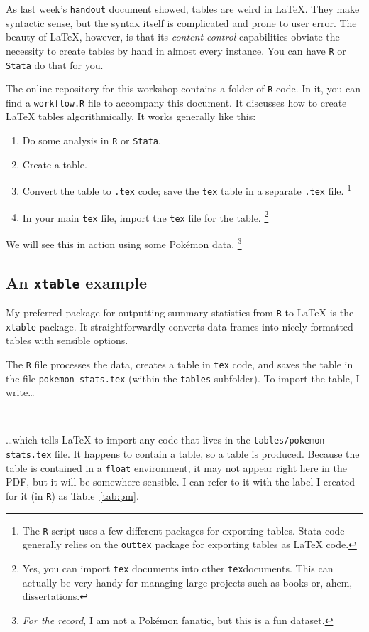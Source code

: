 \documentclass[12pt
              ]{article}
\begin{document}
As last week's \texttt{handout} document showed, tables are weird in {\LaTeX}. They make syntactic sense, but the syntax itself is complicated and prone to user error. The beauty of {\LaTeX}, however, is that its \emph{content control} capabilities obviate the necessity to create tables by hand in almost every instance. You can have \texttt{R} or \texttt{Stata} do that for you.

The online repository for this workshop contains a folder of \texttt{R} code. In it, you can find a \texttt{workflow.R} file to accompany this document. It discusses how to create {\LaTeX} tables algorithmically. It works generally like this:
\begin{enumerate}
 \item Do some analysis in \texttt{R} or \texttt{Stata}.
 \item Create a table. 
 \item Convert the table to \texttt{.tex} code; save the \texttt{tex} table in a separate \texttt{.tex} file.%
   \footnote{The \texttt{R} script uses a few different packages for exporting tables. Stata code generally relies on the \texttt{outtex} package for exporting tables as {\LaTeX} code.}
 \item In your main \texttt{tex} file, import the \texttt{tex} file for the table.%
   \footnote{Yes, you can import \texttt{tex} documents into other \texttt{tex}documents. This can actually be very handy for managing large projects such as books or, ahem, dissertations.}
\end{enumerate}
We will see this in action using some Pok\'emon data.%
  \footnote{\emph{For the record}, I am not a Pok\'emon fanatic, but this is a fun dataset.}

\subsection{An \texttt{xtable} example}

My preferred package for outputting summary statistics from \texttt{R} to {\LaTeX} is the \texttt{xtable} package. It straightforwardly converts data frames into nicely formatted tables with sensible options. 

The \texttt{R} file processes the data, creates a table in \texttt{tex} code, and saves the table in the file \texttt{pokemon-stats.tex} (within the \texttt{tables} subfolder). To import the table, I write\ldots
\newline
\begin{minipage}{\linewidth}
\begin{lstlisting}
  
\end{lstlisting}
\end{minipage}
\ldots which tells {\LaTeX} to import any code that lives in the \texttt{tables/pokemon-stats.tex} file. It happens to contain a table, so a table is produced. Because the table is contained in a \texttt{float} environment, it may not appear right here in the PDF, but it will be somewhere sensible. I can refer to it with the label I created for it (in \texttt{R}) as Table~\ref{tab:pm}.
\end{document}
